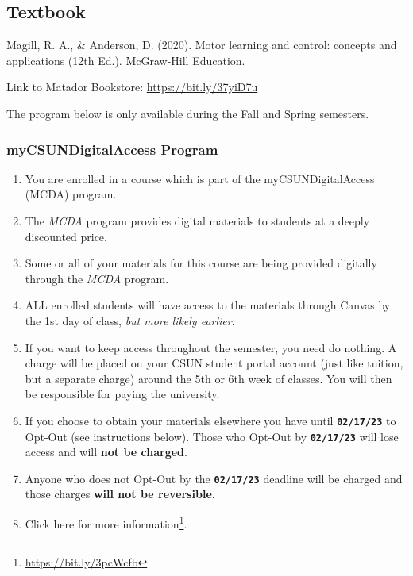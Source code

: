 \documentclass[
  letterpaper,
  DIV=11,
  numbers=noendperiod]{scrartcl}
\providecommand{\tightlist}{%
  \setlength{\itemsep}{0pt}\setlength{\parskip}{0pt}}\usepackage{longtable,booktabs,array}
\DeclareRobustCommand{\href}[2]{#2\footnote{\url{#1}}}
\begin{document}
\hypertarget{textbook}{%
\subsection{Textbook}\label{textbook}}

Magill, R. A., \& Anderson, D. (2020). Motor learning and control:
concepts and applications (12th Ed.). McGraw-Hill Education.

Link to Matador Bookstore: \url{https://bit.ly/37yiD7u}

\begin{tcolorbox}[enhanced jigsaw, colbacktitle=quarto-callout-note-color!10!white, rightrule=.15mm, opacityback=0, colframe=quarto-callout-note-color-frame, leftrule=.75mm, breakable, bottomrule=.15mm, arc=.35mm, opacitybacktitle=0.6, title=\textcolor{quarto-callout-note-color}{\faInfo}\hspace{0.5em}{Note}, titlerule=0mm, toptitle=1mm, bottomtitle=1mm, left=2mm, toprule=.15mm, colback=white, coltitle=black]

The program below is only available during the Fall and Spring
semesters.

\end{tcolorbox}

\hypertarget{sec-mycsundigitalaccess}{%
\subsubsection{myCSUNDigitalAccess
Program}\label{sec-mycsundigitalaccess}}

\begin{enumerate}
\def\labelenumi{\arabic{enumi}.}
\tightlist
\item
  You are enrolled in a course which is part of the myCSUNDigitalAccess
  (MCDA) program.
\item
  The \emph{MCDA} program provides digital materials to students at a
  deeply discounted price.
\item
  Some or all of your materials for this course are being provided
  digitally through the \emph{MCDA} program.
\item
  ALL enrolled students will have access to the materials through Canvas
  by the 1st day of class, \emph{but more likely earlier}.
\item
  If you want to keep access throughout the semester, you need do
  nothing. A charge will be placed on your CSUN student portal account
  (just like tuition, but a separate charge) around the 5th or 6th week
  of classes. You will then be responsible for paying the university.
\item
  If you choose to obtain your materials elsewhere you have until
  \textbf{\texttt{02/17/23}} to Opt-Out (see instructions below). Those
  who Opt-Out by \textbf{\texttt{02/17/23}} will lose access and will
  \textbf{not be charged}.
\item
  Anyone who does not Opt-Out by the \textbf{\texttt{02/17/23}} deadline
  will be charged and those charges \textbf{will not be reversible}.
\item
  \href{https://bit.ly/3pcWcfb}{Click here for more information}.
\end{enumerate}
\end{document}
